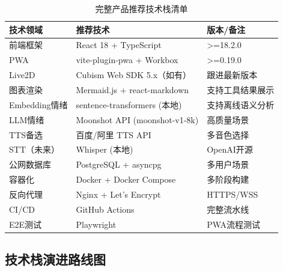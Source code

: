 \documentclass[fontset=mac,a4paper,11pt]{ctexart}
\begin{document}
\begin{table}[H]
\centering
\caption{完整产品推荐技术栈清单}
\label{tab:full-stack}
\begin{tabular}{L{3.5cm}L{4.5cm}L{4cm}}
\toprule
\textbf{技术领域} & \textbf{推荐技术} & \textbf{版本/备注} \\
\midrule
{}
前端框架 & React 18 + TypeScript & >=18.2.0 \\
PWA & vite-plugin-pwa + Workbox & >=0.19.0 \\
Live2D & Cubism Web SDK 5.x（如有） & 跟进最新版本 \\
图表渲染 & Mermaid.js + react-markdown & 支持工具结果展示 \\
Embedding情绪 & sentence-transformers (本地) & 支持离线语义分析 \\
LLM情绪 & Moonshot API (moonshot-v1-8k) & 高质量场景 \\
TTS备选 & 百度/阿里 TTS API & 多音色选择 \\
STT（未来） & Whisper (本地) & OpenAI开源 \\
公网数据库 & PostgreSQL + asyncpg & 多用户场景 \\
容器化 & Docker + Docker Compose & 多阶段构建 \\
反向代理 & Nginx + Let's Encrypt & HTTPS/WSS \\
CI/CD & GitHub Actions & 完整流水线 \\
E2E测试 & Playwright & PWA流程测试 \\
\bottomrule
\end{tabular}
\end{table}

\subsection{技术栈演进路线图}
\end{document}
